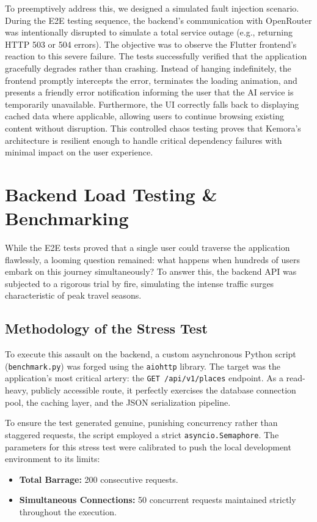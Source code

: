 To preemptively address this, we designed a simulated fault injection scenario. During the E2E testing sequence, the backend's communication with OpenRouter was intentionally disrupted to simulate a total service outage (e.g., returning HTTP 503 or 504 errors). The objective was to observe the Flutter frontend's reaction to this severe failure. The tests successfully verified that the application gracefully degrades rather than crashing. Instead of hanging indefinitely, the frontend promptly intercepts the error, terminates the loading animation, and presents a friendly error notification informing the user that the AI service is temporarily unavailable. Furthermore, the UI correctly falls back to displaying cached data where applicable, allowing users to continue browsing existing content without disruption. This controlled chaos testing proves that Kemora's architecture is resilient enough to handle critical dependency failures with minimal impact on the user experience.

\section{Backend Load Testing \& Benchmarking}
While the E2E tests proved that a single user could traverse the application flawlessly, a looming question remained: what happens when hundreds of users embark on this journey simultaneously? To answer this, the backend API was subjected to a rigorous trial by fire, simulating the intense traffic surges characteristic of peak travel seasons.

\subsection{Methodology of the Stress Test}
To execute this assault on the backend, a custom asynchronous Python script (\texttt{benchmark.py}) was forged using the \texttt{aiohttp} library. The target was the application's most critical artery: the \texttt{GET /api/v1/places} endpoint. As a read-heavy, publicly accessible route, it perfectly exercises the database connection pool, the caching layer, and the JSON serialization pipeline. 

To ensure the test generated genuine, punishing concurrency rather than staggered requests, the script employed a strict \texttt{asyncio.Semaphore}. The parameters for this stress test were calibrated to push the local development environment to its limits:
\begin{itemize}
    \item \textbf{Total Barrage:} 200 consecutive requests.
    \item \textbf{Simultaneous Connections:} 50 concurrent requests maintained strictly throughout the execution.
\end{itemize}

